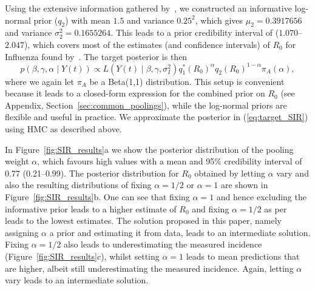 \documentclass[a4paper, notitlepage, 10pt]{article}
\begin{document}
Using the extensive information gathered by~\cite{Biggerstaff2014}, we constructed an informative log-normal prior ($q_2$) with mean $1.5$ and variance $0.25^2$, which gives $\mu_2 = 0.3917656$ and variance $\sigma_2^2 =  0.1655264$.
This leads to a prior credibility interval of ($1.070$--$2.047$), which covers most of the estimates (and confidence intervals) of $R_0$ for Influenza found by~\cite{Biggerstaff2014}.
The target posterior is then
\begin{equation}
 \label{eq:target_SIR}
 p(\beta, \gamma, \alpha \mid Y(t)) \propto  L(Y(t)\mid \beta, \gamma, \sigma_I^2) q_1^\ast(R_0)^\alpha q_2(R_0)^{1-\alpha}\pi_A(\alpha),
\end{equation}
where we again let $\pi_A$ be a Beta(1,1) distribution.
This setup is convenient because it leads to a closed-form expression for the combined prior on $R_0$ (see Appendix, Section~\ref{sec:common_poolings}), while the log-normal priors are flexible and useful in practice.
We approximate the posterior in (\ref{eq:target_SIR}) using HMC as described above.

In Figure~\ref{fig:SIR_results}a we show the posterior distribution of the pooling weight $\alpha$, which favours high values with a mean and 95\% credibility interval of 0.77 (0.21--0.99).
The posterior distribution for $R_0$ obtained by letting $\alpha$ vary and also the resulting distributions of fixing $\alpha = 1/2$ or $\alpha = 1$ are shown in Figure~\ref{fig:SIR_results}b.
One can see that fixing $\alpha = 1$ and hence excluding the informative prior leads to a higher estimate of $R_0$ and fixing $\alpha = 1/2$ as per~\cite{poole2000} leads to the lowest estimates.
The solution proposed in this paper, namely assigning $\alpha$ a prior and estimating it from data, leads to an intermediate solution.
Fixing $\alpha = 1/2$ also leads to underestimating the measured incidence (Figure~\ref{fig:SIR_results}c), whilst setting $\alpha = 1$ leads to mean predictions that are higher, albeit still underestimating the measured incidence.
Again, letting $\alpha$ vary leads to an intermediate solution.
\end{document}
